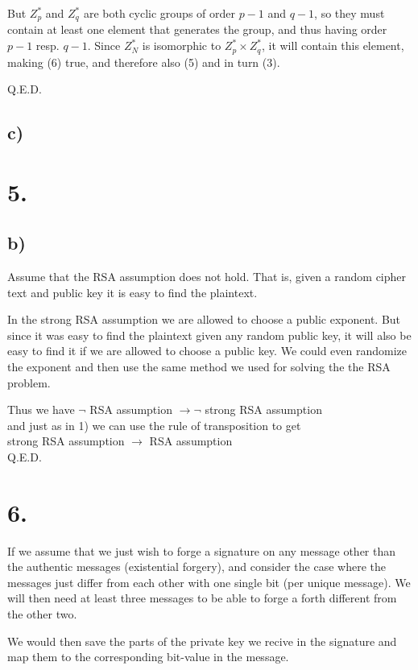 \documentclass[a4paper,11pt]{article}
\begin{document}
	But $Z^*_p$ and $Z^*_q$ are both cyclic groups of order $p-1$ and $q-1$,
	so they must contain at least one element that generates the group, 
	and thus having order $p-1$ resp. $q-1$. Since $Z^*_N$ is isomorphic to $Z^*_p \times Z^*_q$,
	it will contain this element, making (6) true, and therefore also (5) and in turn (3).

	Q.E.D.

	\subsection*{c) }

	\section*{5. }

	\subsection*{b) }
	Assume that the RSA assumption does not hold. That is, given a random cipher text and
	public key it is easy to find the plaintext.
	
	In the strong RSA assumption we are allowed to choose a public exponent. But since it was
	easy to find the plaintext given any random public key, it will also be easy to find
	it if we are allowed to choose a public key. We could even randomize the exponent
	and then use the same method we used for solving the the RSA problem.

	Thus we have $\neg $ RSA assumption $ \to \neg $ strong RSA assumption\\
	and just as in 1) we can use the rule of transposition to get\\
	strong RSA assumption $ \to $ RSA assumption\\

	Q.E.D.

	\section*{6. }
	If we assume that we just wish to forge a signature on any message other than the authentic
	messages (existential forgery), and consider the case where the messages just differ from 
	each other with one single bit (per unique message). We will then need at least three 
	messages to be able to forge a forth different from the other two.

	We would then save the parts of the private key we recive in the signature and map
	them to the corresponding bit-value in the message.
\end{document}
